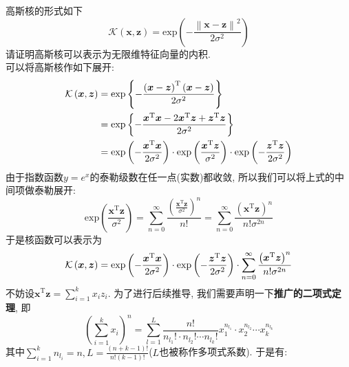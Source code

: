 \documentclass{article}
\begin{document}
\begin{homeworkProblem}
	高斯核的形式如下
	$$
	\mathcal{K}\left( \boldsymbol{x},\boldsymbol{z} \right) =\text{exp} \left( -\frac{\left\| \boldsymbol{x}-\boldsymbol{z} \right\| ^2}{2\sigma ^2} \right) 
	$$
	请证明高斯核可以表示为无限维特征向量的内积.
	\\

	\solution 可以将高斯核作如下展开:
	\begin{align}
		\mathcal{K}\left( \boldsymbol{x},\boldsymbol{z} \right) &=\text{exp} \left\{ -\frac{\left( \boldsymbol{x}-\boldsymbol{z} \right) ^{\text{T}}\left( \boldsymbol{x}-\boldsymbol{z} \right)}{2\sigma ^2} \right\}  \notag
		\\
		&=\text{exp} \left\{ -\frac{\boldsymbol{x}^{\text{T}}\boldsymbol{x}-2\boldsymbol{x}^{\text{T}}\boldsymbol{z}+\boldsymbol{z}^{\text{T}}\boldsymbol{z}}{2\sigma ^2} \right\}  \notag
		\\
		&=\text{exp} \left( -\frac{\boldsymbol{x}^{\text{T}}\boldsymbol{x}}{2\sigma ^2} \right) \cdot \text{exp} \left( \frac{\boldsymbol{x}^{\text{T}}\boldsymbol{z}}{\sigma ^2} \right) \cdot \text{exp} \left( -\frac{\boldsymbol{z}^{\text{T}}\boldsymbol{z}}{2\sigma ^2} \right) \notag
	\end{align}
	由于指数函数$y=e^x$的泰勒级数在任一点(实数)都收敛, 所以我们可以将上式的中间项做泰勒展开:$$\text{exp} \left( \frac{\boldsymbol{x}^{\text{T}}\boldsymbol{z}}{\sigma ^2} \right) =\sum_{n=0}^{\infty}{\frac{\left( \frac{\boldsymbol{x}^{\text{T}}\boldsymbol{z}}{\sigma ^2} \right) ^n}{n!}}=\sum_{n=0}^{\infty}{\frac{\left( \boldsymbol{x}^{\text{T}}\boldsymbol{z} \right) ^n}{n!\sigma ^{2n}}}
	$$
	于是核函数可以表示为
	\begin{align}
		\mathcal{K}\left( \boldsymbol{x},\boldsymbol{z} \right) =\text{exp} \left( -\frac{\boldsymbol{x}^{\text{T}}\boldsymbol{x}}{2\sigma ^2} \right) \cdot \text{exp} \left( -\frac{\boldsymbol{z}^{\text{T}}\boldsymbol{z}}{2\sigma ^2} \right) \cdot \sum_{n=0}^{\infty}{\frac{\left( \boldsymbol{x}^{\text{T}}\boldsymbol{z} \right) ^n}{n!\sigma ^{2n}}} \notag
	\end{align}
	不妨设$\displaystyle \boldsymbol{x}^{\text{T}}\boldsymbol{z}=\sum_{i=1}^k{x_iz_i}$. 为了进行后续推导, 我们需要声明一下\textbf{推广的二项式定理}, 即
	$$
	\left( \sum_{i=1}^k{x_i} \right) ^n=\sum_{l=1}^L{\frac{n!}{n_{l_1}!\cdot n_{l_2}!\cdots n_{l_k}!}x_{1}^{n_{l_1}}\cdot x_{2}^{n_{l_2}}\cdots x_{k}^{n_{l_k}}}
	$$
	其中$\displaystyle \sum_{i=1}^k{n_{l_i}}=n,L=\frac{\left( n+k-1 \right) !}{n!\left( k-1 \right) !}$($L$也被称作多项式系数).
	于是有:

\end{homeworkProblem}
\end{document}
